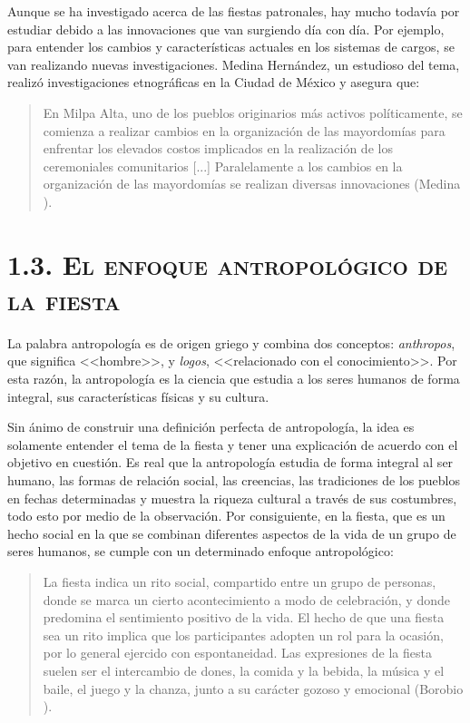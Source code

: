 \documentclass[14pt,letterpaper,twoside]{extbook} %
\begin{document}
Aunque se ha investigado acerca de las fiestas patronales, hay mucho todavía por estudiar debido a las innovaciones que van surgiendo día con día. Por ejemplo, para entender los cambios y características actuales en los sistemas de cargos, se van realizando nuevas investigaciones. Medina Hernández, un estudioso del tema, realizó investigaciones etnográficas en la Ciudad de México y asegura que:

\begin{quotation}
\noindent En Milpa Alta, uno de los pueblos originarios más activos políticamente, se comienza a realizar cambios en la organización de las mayordomías para enfrentar los elevados costos implicados en la realización de los ceremoniales comunitarios [...] Paralelamente a los cambios en la organización de las mayordomías se realizan diversas innovaciones (Medina ).
\end{quotation}

\section*{\mdseries\large\textsc{1.3. El enfoque antropológico de la fiesta}}

\noindent La palabra antropología es de origen griego y combina dos conceptos: \textit{anthropos}, que significa <<hombre>>, y \textit{logos}, <<relacionado con el conocimiento>>. Por esta razón, la antropología es la ciencia que estudia a los seres humanos de forma integral, sus características físicas y su cultura.

Sin ánimo de construir una definición perfecta de antropología, la idea es solamente entender el tema de la fiesta y tener una explicación de acuerdo con el objetivo en cuestión. Es real que la antropología estudia de forma integral al ser humano, las formas de relación social, las creencias, las tradiciones de los pueblos en fechas determinadas y muestra la riqueza cultural a través de sus costumbres, todo esto por medio de la observación. Por consiguiente, en la fiesta, que es un hecho social en la que se combinan diferentes aspectos de la vida de un grupo de seres humanos, se cumple con un determinado enfoque antropológico:

\begin{quotation}
\noindent La fiesta indica un rito social, compartido entre un grupo de personas, donde se marca un cierto acontecimiento a modo de celebración, y donde predomina el sentimiento positivo de la vida. El hecho de que una fiesta sea un rito implica que los participantes adopten un rol para la ocasión, por lo general ejercido con espontaneidad. Las expresiones de la fiesta suelen ser el intercambio de dones, la comida y la bebida, la música y el baile, el juego y la chanza, junto a su carácter gozoso y emocional (Borobio ).
\end{quotation}
\end{document}
